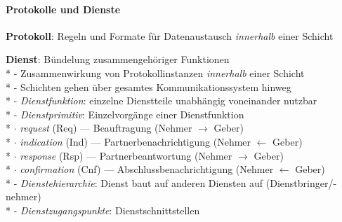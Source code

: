 \paragraph{Protokolle und Dienste}
\begin{items}
  \item \textbf{Protokoll}: Regeln und Formate für Datenaustausch \emph{innerhalb} einer Schicht
  \item \textbf{Dienst}: Bündelung zusammengehöriger Funktionen \\*
    - Zusammenwirkung von Protokollinstanzen \emph{innerhalb} einer Schicht \\*
    - Schichten gehen über gesamtes Kommunikationssystem hinweg\\*
    - \emph{Dienstfunktion}: einzelne Dienstteile unabhängig voneinander nutzbar \\*
    - \emph{Dienstprimitiv}: Einzelvorgänge einer Dienstfunktion \\*
      \phantom{-} \( \cdot \) \emph{request} (Req) --- Beauftragung (Nehmer \( \to \) Geber) \\*
      \phantom{-} \( \cdot \) \emph{indication} (Ind) --- Partnerbenachrichtigung (Nehmer \( \leftarrow \) Geber) \\*
      \phantom{-} \( \cdot \) \emph{response} (Rsp) --- Partnerbeantwortung (Nehmer \( \to \) Geber) \\*
      \phantom{-} \( \cdot \) \emph{confirmation} (Cnf) --- Abschlussbenachrichtigung (Nehmer \( \leftarrow  \) Geber) \\*
    - \emph{Dienstehierarchie}: Dienst baut auf anderen Diensten auf (Dienstbringer/-nehmer) \\*
    - \emph{Dienstzugangspunkte}: Dienstschnittstellen
\end{items}

